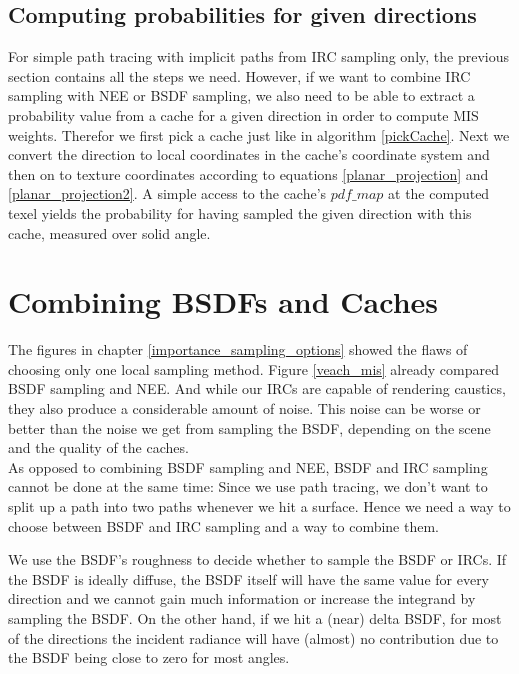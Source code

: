 \subsection{Computing probabilities for given directions}
\label{computePdf}
For simple path tracing with implicit paths from IRC sampling only, the previous section contains all the steps we need. However, if we want to combine IRC sampling with NEE or BSDF sampling, we also need to be able to extract a probability value from a cache for a given direction in order to compute MIS weights.\newline
Therefor we first pick a cache just like in algorithm \ref{pickCache}. Next we convert the direction to local coordinates in the cache's coordinate system and then on to texture coordinates according to equations \ref{planar_projection} and \ref{planar_projection2}. A simple access to the cache's $pdf\_map$ at the computed texel yields the probability for having sampled the given direction with this cache, measured over solid angle.









\newpage
\section{Combining BSDFs and Caches}
\label{combining BSDFs and caches}
The figures in chapter \ref{importance_sampling_options} showed the flaws of choosing only one local sampling method. Figure \ref{veach_mis} already compared BSDF sampling and NEE. And while our IRCs are capable of rendering caustics, they also produce a considerable amount of noise. This noise can be worse or better than the noise we get from sampling the BSDF, depending on the scene and the quality of the caches.\\
As opposed to combining BSDF sampling and NEE, BSDF and IRC sampling cannot be done at the same time: Since we use path tracing, we don't want to split up a path into two paths whenever we hit a surface. Hence we need a way to choose between BSDF and IRC sampling and a way to combine them.

We use the BSDF's roughness to decide whether to sample the BSDF or IRCs. If the BSDF is ideally diffuse, the BSDF itself will have the same value for every direction and we cannot gain much information or increase the integrand by sampling the BSDF. On the other hand, if we hit a (near) delta BSDF, for most of the directions the incident radiance will have (almost) no contribution due to the BSDF being close to zero for most angles.

